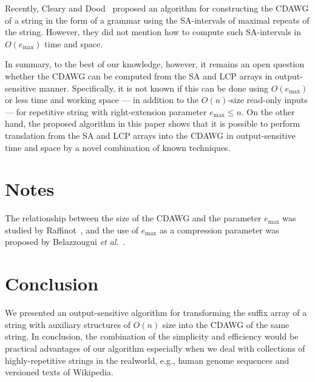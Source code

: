 \documentclass{article}
\begin{document}
Recently, Cleary and Dood~\cite{cleary2023constructing} proposed an algorithm for constructing the CDAWG of a string in the form of a grammar using the SA-intervals of maximal repeats of the string. However, they did not mention how to compute such SA-intervals in $O(e_{\max})$ time and space. 

In summary, to the best of our knowledge, however, it remains an open question whether the CDAWG can be computed from the SA and LCP arrays in output-sensitive manner.
Specifically, it is not known if this can be done using $O(e_{\max})$ or less time and working space --- in addition to the $O(n)$-size read-only inputs --- for repetitive string with right-extension parameter $e_{\max} \le n$.
On the other hand, the proposed algorithm in this paper shows that it is possible to perform translation from the SA and LCP arrays into the CDAWG in output-sensitive time and space by a novel combination of known techniques.  

\section{Notes}
\label{sec:notes}

The relationship between the size of the CDAWG and the parameter $e_{\max}$ was studied by Raffinot~\cite{raffinot2001maximal}, and the use of $e_{\max}$ as a compression parameter was proposed by Belazzougui \textit{et al.}~\cite{belazzougui:nunial:gagie:prezza:raffinot2015composite}.

\section{Conclusion}
\label{sec:concl}
We presented an output-sensitive algorithm for transforming the suffix array of a string with auxiliary structures of $O(n)$ size into the CDAWG of the same string. 
In conclusion, the combination of the simplicity and efficiency would be practical advantages of our algorithm especially when we deal with collections of highly-repetitive strings in the realworld, e.g., human genome sequences and versioned texts of Wikipedia. 



\newpage


\end{document}
